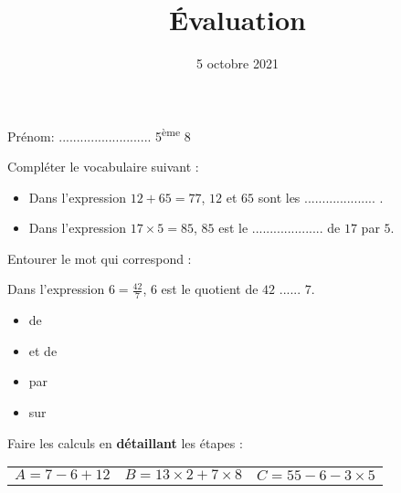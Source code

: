 \documentclass[a4paper,11pt]{article}
\title{Évaluation}
\date{5 octobre 2021}
\begin{document}
\begin{minipage}[t][0.45\textheight][t]{\textwidth}
	Prénom: .......................... \hfill 5\textsuperscript{ème} 8
	\begin{center}
		\begin{huge}
			\makeatletter
			\@title
			\makeatother
		\end{huge}

		\makeatletter
		\@date
		\makeatother
	\end{center}

	\begin{exercice}[(2 points)]
		Compléter le vocabulaire suivant :
		\begin{itemize}
			\item Dans l'expression $12 + 65 = 77$, $12$ et $65$ sont les .................... .
			\item Dans l'expression $17 × 5 = 85$, $85$ est le .................... de $17$ par $5$.
		\end{itemize}

		Entourer le mot qui correspond :

		\begin{center}
			Dans l'expression $6 = \frac{42}{7}$, $6$ est le quotient de $42$ ...... $7$.

			\begin{multicols}{4}
				\begin{itemize}
					\item de
					\item et de
					\item par
					\item sur
				\end{itemize}
			\end{multicols}
		\end{center}
	\end{exercice}

	\begin{exercice}[(6 points)]
		Faire les calculs en \textbf{détaillant} les étapes :

		\begin{tabular}{ccc}
			$A = 7 - 6 + 12$ \hspace{1cm} & $B = 13 × 2 + 7 × 8$ \hspace{1cm} & $C = 55 - 6 - 3 × 5$
		\end{tabular}
		\vspace{1cm}
	\end{exercice}

\end{minipage}
\end{document}
